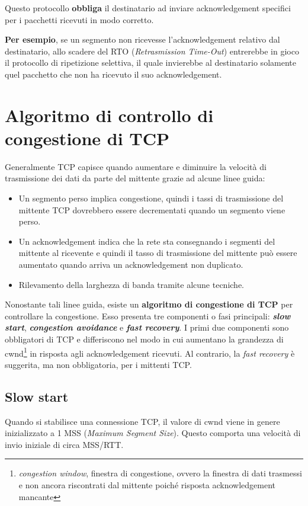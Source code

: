 \documentclass[a4paper]{article}
\begin{document}
	\noindent
	Questo protocollo \textbf{obbliga} il destinatario ad inviare acknowledgement specifici per i pacchetti ricevuti in modo corretto.\newline
	
	\noindent
	\textbf{Per esempio}, se un segmento non ricevesse l’acknowledgement relativo dal destinatario, allo scadere del RTO (\emph{Retrasmission Time-Out}) entrerebbe in gioco il protocollo di ripetizione selettiva, il quale invierebbe al destinatario solamente quel pacchetto che non ha ricevuto il suo acknowledgement.\newpage
	
	\section{Algoritmo di controllo di congestione di TCP}
	
	Generalmente TCP capisce quando aumentare e diminuire la velocità di trasmissione dei dati da parte del mittente grazie ad alcune linee guida:
	\begin{itemize}
		\item Un segmento perso implica congestione, quindi i tassi di trasmissione del mittente TCP dovrebbero essere decrementati quando un segmento viene perso.
		\item Un acknowledgement indica che la rete sta consegnando i segmenti del mittente al ricevente e quindi il tasso di trasmissione del mittente può essere aumentato quando arriva un acknowledgement non duplicato.
		\item Rilevamento della larghezza di banda tramite alcune tecniche.
	\end{itemize}
	Nonostante tali linee guida, esiste un \textcolor{Red3}{\textbf{algoritmo di congestione di TCP}} per controllare la congestione. Esso presenta tre componenti o fasi principali: \textbf{\emph{slow start}}, \textbf{\emph{congestion avoidance}} e \textbf{\emph{fast recovery}}. I primi due componenti sono obbligatori di TCP e differiscono nel modo in cui aumentano la grandezza di \textsf{cwnd}\footnote{\emph{congestion window}, finestra di congestione, ovvero la finestra di dati trasmessi e non ancora riscontrati dal mittente poiché risposta acknowledgement mancante} in risposta agli acknowledgement ricevuti.  Al contrario, la \emph{fast recovery} è suggerita, ma non obbligatoria, per i mittenti TCP.\newpage
	
	\subsection{Slow start}
	Quando si stabilisce una connessione TCP, il valore di \textsf{cwnd} viene in genere inizializzato a 1 MSS (\emph{Maximum Segment Size}). Questo comporta una velocità di invio iniziale di circa MSS/RTT.\newline
	
\end{document}
